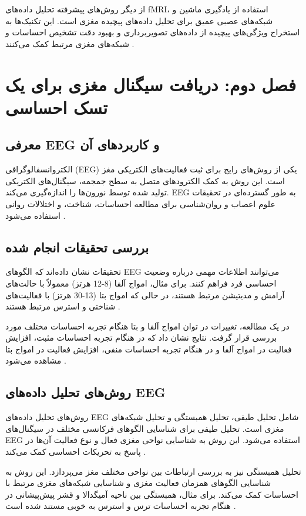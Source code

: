\documentclass[12pt]{article}
\begin{document}
از دیگر روش‌های پیشرفته تحلیل داده‌های fMRI، استفاده از یادگیری ماشین و شبکه‌های عصبی عمیق برای تحلیل داده‌های پیچیده مغزی است. این تکنیک‌ها به استخراج ویژگی‌های پیچیده از داده‌های تصویربرداری و بهبود دقت تشخیص احساسات و شبکه‌های مغزی مرتبط کمک می‌کنند \cite{He2020}.

\section{فصل دوم: دریافت سیگنال مغزی برای یک تسک احساسی}

\subsection{معرفی EEG و کاربردهای آن}

الکتروانسفالوگرافی (EEG) یکی از روش‌های رایج برای ثبت فعالیت‌های الکتریکی مغز است. این روش به کمک الکترودهای متصل به سطح جمجمه، سیگنال‌های الکتریکی تولید شده توسط نورون‌ها را اندازه‌گیری می‌کند. EEG به طور گسترده‌ای در تحقیقات علوم اعصاب و روان‌شناسی برای مطالعه احساسات، شناخت، و اختلالات روانی استفاده می‌شود \cite{Zhao2021}.

\subsection{بررسی تحقیقات انجام شده}

تحقیقات نشان داده‌اند که الگوهای EEG می‌توانند اطلاعات مهمی درباره وضعیت احساسی فرد فراهم کنند. برای مثال، امواج آلفا (8-12 هرتز) معمولاً با حالت‌های آرامش و مدیتیشن مرتبط هستند، در حالی که امواج بتا (13-30 هرتز) با فعالیت‌های شناختی و استرس مرتبط هستند \cite{Zhao2021}.

در یک مطالعه، تغییرات در توان امواج آلفا و بتا هنگام تجربه احساسات مختلف مورد بررسی قرار گرفت. نتایج نشان داد که در هنگام تجربه احساسات مثبت، افزایش فعالیت در امواج آلفا و در هنگام تجربه احساسات منفی، افزایش فعالیت در امواج بتا مشاهده می‌شود \cite{Shu2018}.

\subsection{روش‌های تحلیل داده‌های EEG}

روش‌های تحلیل داده‌های EEG شامل تحلیل طیفی، تحلیل همبستگی و تحلیل شبکه‌های مغزی است. تحلیل طیفی برای شناسایی الگوهای فرکانسی مختلف در سیگنال‌های EEG استفاده می‌شود. این روش به شناسایی نواحی مغزی فعال و نوع فعالیت آن‌ها در پاسخ به تحریکات احساسی کمک می‌کند \cite{Zhao2021}.

تحلیل همبستگی نیز به بررسی ارتباطات بین نواحی مختلف مغز می‌پردازد. این روش به شناسایی الگوهای همزمان فعالیت مغزی و شناسایی شبکه‌های مغزی مرتبط با احساسات کمک می‌کند. برای مثال، همبستگی بین ناحیه آمیگدالا و قشر پیش‌پیشانی در هنگام تجربه احساسات ترس و استرس به خوبی مستند شده است \cite{Dzedzickis2020}.
\end{document}
